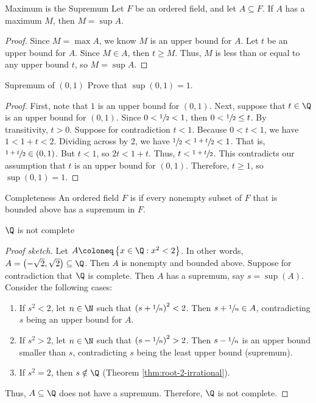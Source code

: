 \begin{thmbox}{Maximum is the Supremum}{}
    Let $F$ be an ordered field, and let $A \subseteq F$. If $A$ has a maximum $M$, then $M = \sup A$.
    \tcblower
    \begin{proof}
        Since $M = \max A$, we know $M$ is an upper bound for $A$. Let $t$ be an upper bound for $A$. Since $M \in A$, then $t \geq M$. Thus, $M$ is less than or equal to any upper bound $t$, so $M = \sup A$.
    \end{proof}
\end{thmbox}

\begin{exbox}{Supremum of $(0,1)$}{}
    Prove that $\sup (0,1) = 1$.
    \tcblower
    \begin{proof}
        First, note that $1$ is an upper bound for $(0,1)$. Next, suppose that $t \in \Q$ is an upper bound for $(0,1)$. Since $0 < \sfrac{1}{2} < 1$, then $0 < \sfrac{1}{2} \leq t$. By transitivity, $t > 0$. Suppose for contradiction $t < 1$. Because $0 < t < 1$, we have $1 < 1 + t < 2$. Dividing across by $2$, we have $\sfrac{1}{2} < \sfrac{1+t}{2} < 1$. That is, $\sfrac{1+t}{2} \in (0,1)$. But $t < 1$, so $2t < 1+t$. Thus, $t < \sfrac{1+t}{2}$. This contradicts our assumption that $t$ is an upper bound for $(0,1)$. Therefore, $t \geq 1$, so $\sup (0,1) = 1$.
    \end{proof}
\end{exbox}

\begin{dfnbox}{Completeness}{}
    An ordered field $F$ is  if every nonempty subset of $F$ that is bounded above has a supremum in $F$.
\end{dfnbox}

\begin{thmbox}{$\Q$ is not complete}{}
    \begin{proof}[Proof sketch]
        Let $A \coloneq \left\{ x \in \Q : x^2 < 2 \right\}$. In other words, $A = \left(-\sqrt{2}, \sqrt{2}\right) \subseteq \Q$. Then $A$ is nonempty and bounded above. Suppose for contradiction that $\Q$ is complete. Then $A$ has a supremum, say $s = \sup(A)$. Consider the following cases:
        \begin{enumerate}
            \item If $s^2 < 2$, let $n \in \N$ such that $\left( s + \sfrac{1}{n} \right)^2 < 2$. Then $s + \sfrac{1}{n} \in A$, contradicting $s$ being an upper bound for $A$.
            \item If $s^2 > 2$, let $n \in \N$ such that $\left( s - \sfrac{1}{n} \right)^2 > 2$. Then $s - \sfrac{1}{n}$ is an upper bound smaller than $s$, contradicting $s$ being the least upper bound (supremum).
            \item If $s^2 = 2$, then $s \notin \Q$ (Theorem \ref{thm:root-2-irrational}).
        \end{enumerate}
        Thus, $A \subseteq \Q$ does not have a supremum. Therefore, $\Q$ is not complete.
    \end{proof}
\end{thmbox}

